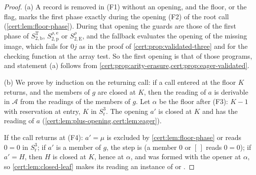 \begin{proof}
(a) A record is removed in (F1) without an opening, and the floor, or the flag, marks
the first phase exactly during the opening (F2) of the root call
(\cref{cert:lem:floor-phase}). During that opening the guards are those of the first
phase of $S^{\mathrm T}_{2,\mathrm b}$, $S^{\rho,\mathrm e}_{2,\mathrm p}$ or
$S^{\rho}_{2,\mathrm E}$, and the fallback evaluates the opening of the missing image,
which fails for $0j$ as in the proof of \cref{cert:prop:validated-three} and for the
checking function at the array test. So the first opening is that of those programs,
and statement (a) follows from \cref{cert:prop:arity-erasure,cert:prop:eager-validated}.

(b) We prove by induction on the returning call: if a call entered at the floor $K$
returns, and the members of $g$ are closed at $K$, then the reading of $a$ is
derivable in $\mathcal A$ from the readings of the members of $g$. Let $\alpha$ be the
floor after (F3): $K-1$ with reservation at entry, $K$ in $S^{3}_{\mathrm r}$. The
opening $a'$ is closed at $K$ and has the reading of $a$
(\cref{cert:lem:plus-opening,cert:lem:eager}).

If the call returns at (F4): $a'=\mu$ is excluded by \cref{cert:lem:floor-phase} or
reads $0=0$ in $S^{3}_{\mathrm r}$; if $a'$ is a member of $g$, the step is
 (a member $0$ or $[\,]$ reads $0=0$); if $a'=H$, then $H$ is closed at
$K$, hence at $\alpha$, and was formed with the opener at $\alpha$, so
\cref{cert:lem:closed-leaf} makes its reading an instance of  or
.


\end{proof}
